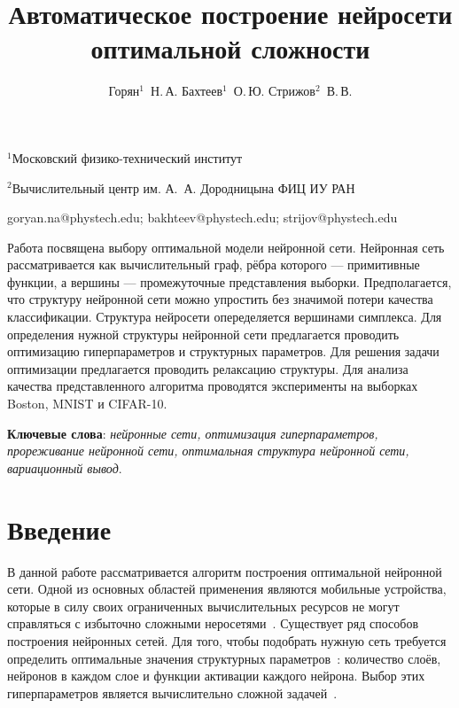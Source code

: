 \documentclass[12pt,twoside]{article}
\begin{document}
\title
    {Автоматическое построение нейросети оптимальной сложности}
\author
    {Горян$^1$~Н.\,А. Бахтеев$^1$~О.\,Ю.  Стрижов$^2$~В.\,В.} %

\organization
    {$^1$Московский физико-технический институт\par
    $^2$Вычислительный центр им. А.~А. Дородницына ФИЦ ИУ РАН}

\email
    {goryan.na@phystech.edu; bakhteev@phystech.edu; strijov@phystech.edu}    


    

\abstract
	{Работа посвящена выбору оптимальной модели нейронной сети. Нейронная сеть рассматривается как вычислительный граф, рёбра которого --- примитивные функции, а вершины --- промежуточные представления выборки. Предполагается, что структуру нейронной сети можно упростить без значимой потери качества классификации. Структура нейросети опеределяется вершинами симплекса. Для определения нужной структуры нейронной сети предлагается проводить оптимизацию гиперпараметров и структурных параметров. Для решения задачи оптимизации предлагается проводить релаксацию структуры. Для анализа качества представленного алгоритма проводятся эксперименты на выборках Boston, MNIST и CIFAR-10.
\bigskip

\textbf{Ключевые слова}: \emph {нейронные сети, оптимизация гиперпараметров, прореживание нейронной сети, оптимальная структура нейронной сети, вариационный вывод}.
}


\maketitle


\section{ Введение}
	
	В данной работе рассматривается алгоритм построения оптимальной нейронной сети. Одной из основных областей применения являются мобильные устройства, которые в силу своих ограниченных вычислительных ресурсов не могут справляться с избыточно сложными неросетями~\cite{rallapalli2016very}. Существует ряд способов построения нейронных сетей. Для того, чтобы подобрать нужную сеть требуется определить оптимальные значения структурных параметров~\cite{Myung1997}: количество слоёв, нейронов в каждом слое и функции активации каждого нейрона. Выбор этих гиперпараметров является вычислительно сложной задачей~\cite{sutskever2014}.
	
\end{document}
